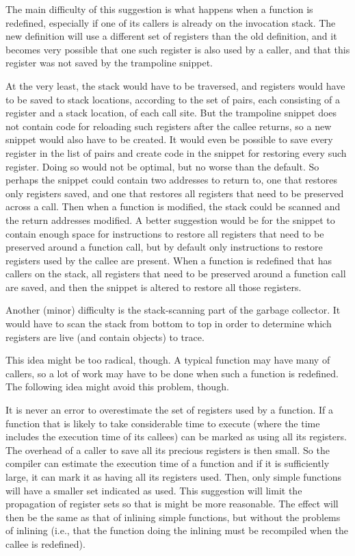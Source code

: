 The main difficulty of this suggestion is what happens when a function
is redefined, especially if one of its callers is already on the
invocation stack.  The new definition will use a different set of
registers than the old definition, and it becomes very possible that
one such register is also used by a caller, and that this register was
not saved by the trampoline snippet.

At the very least, the stack would have to be traversed, and registers
would have to be saved to stack locations, according to the set of
pairs, each consisting of a register and a stack location, of each
call site.  But the trampoline snippet does not contain code for
reloading such registers after the callee returns, so a new snippet
would also have to be created.  It would even be possible to save
every register in the list of pairs and create code in the snippet for
restoring every such register.  Doing so would not be optimal, but no
worse than the default.  So perhaps the snippet could contain two
addresses to return to, one that restores only registers saved, and
one that restores all registers that need to be preserved across a
call.  Then when a function is modified, the stack could be scanned
and the return addresses modified.  A better suggestion would be for
the snippet to contain enough space for instructions to restore all
registers that need to be preserved around a function call, but by
default only instructions to restore registers used by the callee are
present.  When a function is redefined that has callers on the stack,
all registers that need to be preserved around a function call are
saved, and then the snippet is altered to restore all those registers.

Another (minor) difficulty is the stack-scanning part of the garbage
collector.  It would have to scan the stack from bottom to top in
order to determine which registers are live (and contain \commonlisp{}
objects) to trace.

This idea might be too radical, though.  A typical function may have
many of callers, so a lot of work may have to be done when such a
function is redefined.  The following idea might avoid this problem,
though.

It is never an error to overestimate the set of registers used by a
function.  If a function that is likely to take considerable time to
execute (where the time includes the execution time of its callees)
can be marked as using all its registers.  The overhead of a caller to
save all its precious registers is then small.  So the compiler can
estimate the execution time of a function and if it is sufficiently
large, it can mark it as having all its registers used.  Then, only
simple functions will have a smaller set indicated as used.  This
suggestion will limit the propagation of register sets so that is
might be more reasonable.  The effect will then be the same as that of
inlining simple functions, but without the problems of inlining (i.e.,
that the function doing the inlining must be recompiled when the
callee is redefined).

